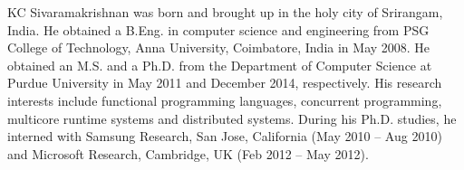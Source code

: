 \begin{vita}
KC Sivaramakrishnan was born and brought up in the holy city of Srirangam,
India. He obtained a B.Eng. in computer science and engineering from PSG
College of Technology, Anna University, Coimbatore, India in May 2008. He
obtained an M.S. and a Ph.D. from the Department of Computer Science at Purdue
University in May 2011 and December 2014, respectively. His research interests
include functional programming languages, concurrent programming, multicore
runtime systems and distributed systems. During his Ph.D. studies, he interned
with Samsung Research, San Jose, California (May 2010 -- Aug 2010) and
Microsoft Research, Cambridge, UK (Feb 2012 -- May 2012).
\end{vita}
